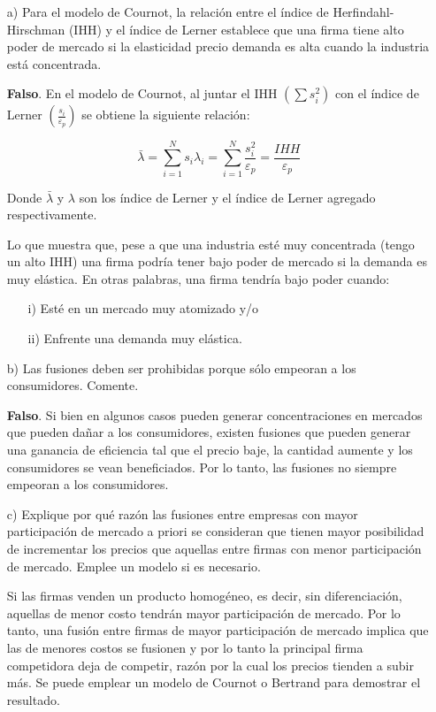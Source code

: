 \documentclass{exam}
\begin{document}
\begin{itemize}
    \item[a)] Para el modelo de Cournot, la relación entre el índice de Herfindahl-Hirschman (IHH) y el índice de Lerner establece que una firma tiene alto poder de mercado si la elasticidad precio demanda es alta cuando la industria está concentrada. 
    \begin{solution}
        \textbf{Falso}. En el modelo de Cournot, al juntar el IHH \(\left( \sum s_i^2 \right)\) con el índice de Lerner \(\left( \frac{s_i}{\varepsilon_p} \right)\) se obtiene la siguiente relación:

\[
\bar{\lambda} = \sum_{i=1}^{N} s_i \lambda_i = \sum_{i=1}^{N} \frac{s_i^2}{\varepsilon_p} = \frac{IHH}{\varepsilon_p}
\]

Donde \(\bar{\lambda}\) y \(\lambda\) son los índice de Lerner y el índice de Lerner agregado respectivamente.

Lo que muestra que, pese a que una industria esté muy concentrada (tengo un alto IHH) una firma podría tener bajo poder de mercado si la demanda es muy elástica. En otras palabras, una firma tendría bajo poder cuando: 
\begin{itemize}
    \item[i)] Esté en un mercado muy atomizado y/o 
    \item[ii)] Enfrente una demanda muy elástica.
\end{itemize}
\end{solution}

\item [b)] Las fusiones deben ser prohibidas porque sólo empeoran a los consumidores. Comente.
\begin{solution}
    \textbf{Falso}. Si bien en algunos casos pueden generar concentraciones en mercados que pueden dañar a los consumidores, existen fusiones que pueden generar una ganancia de eficiencia tal que el precio baje, la cantidad aumente y los consumidores se vean beneficiados. Por lo tanto, las fusiones no siempre empeoran a los consumidores.
\end{solution}
\item[c)] Explique por qué razón las fusiones entre empresas con mayor participación de mercado a priori se consideran que tienen mayor posibilidad de incrementar los precios que aquellas entre firmas con menor participación de mercado. Emplee un modelo si es necesario.
\begin{solution}
    Si las firmas venden un producto homogéneo, es decir, sin diferenciación, aquellas de menor costo tendrán mayor participación de mercado. Por lo tanto, una fusión entre firmas de mayor participación de mercado implica que las de menores costos se fusionen y por lo tanto la principal firma competidora deja de competir, razón por la cual los precios tienden a subir más. Se puede emplear un modelo de Cournot o Bertrand para demostrar el resultado.
\end{solution}


\end{itemize}
\end{document}
